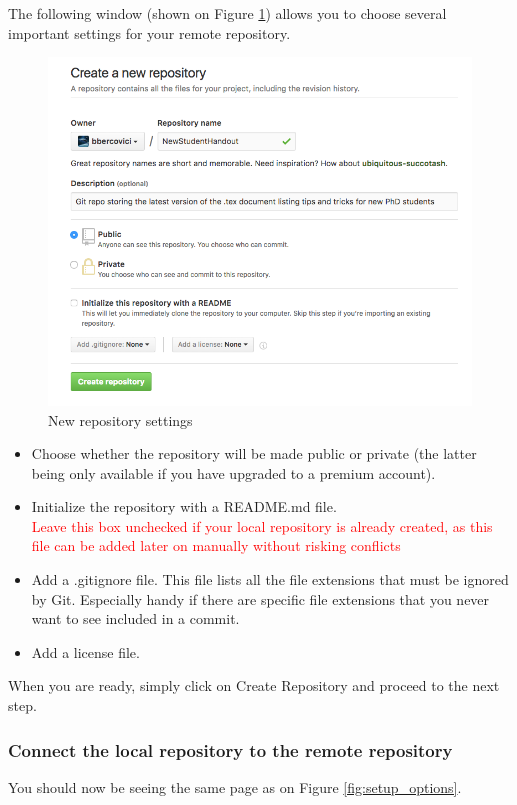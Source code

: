The following window (shown on Figure \ref{fig:new_repo_settings}) allows you to choose several important settings for your remote repository.
\begin{figure}[H]
\centering
\includegraphics[scale=0.6]{new_repo_settings}
\caption{New repository settings}
\label{fig:new_repo_settings}
\end{figure}

\begin{itemize}
\item Choose whether the repository will be made public or private (the latter being only available if you have upgraded to a premium account).
\item Initialize the repository with a README.md file. \\\textcolor{red}{Leave this box unchecked if your local repository is already created, as this file can be added later on manually without risking conflicts}
\item Add a .gitignore file. This file lists all the file extensions that must be ignored by Git. Especially handy if there are specific file extensions that you never want to see included in a commit.
\item Add a license file.
\end{itemize}
When you are ready, simply click on Create Repository and proceed to the next step.
\subsubsection{Connect the local repository to the remote repository}
You should now be seeing the same page as on Figure \ref{fig:setup_options}. 

